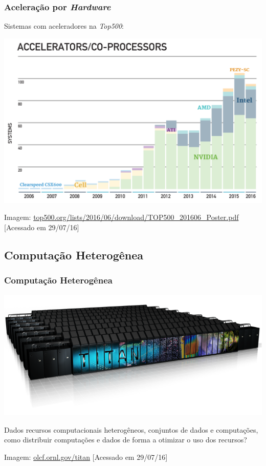 \documentclass[10pt, compress]{beamer}
\begin{document}
\begin{frame}
    \frametitle{Aceleração por \textit{Hardware}}
    Sistemas com aceleradores na \textit{Top500}:

    \begin{center}
    \includegraphics[width=.95\textwidth]{top500_accel}
    \hfill

        \tiny{Imagem: \url{top500.org/lists/2016/06/download/TOP500_201606_Poster.pdf} [Acessado em 29/07/16]}
    \end{center}
\end{frame}

\subsection{Computação Heterogênea}

\begin{frame}
    \frametitle{Computação Heterogênea}
    \begin{center}
        \includegraphics[width=.83\textwidth]{titan}
    \end{center}

    \pause

    Dados recursos computacionais \alert{heterogêneos}, conjuntos de
    \alert{dados} e \alert{computações}, como distribuir computações e dados de
    forma a \alert{otimizar o uso} dos recursos?
    \hfill

    \begin{center}
    \tiny{Imagem: \url{olcf.ornl.gov/titan} [Acessado em 29/07/16]}
    \end{center}
\end{frame}
\end{document}
